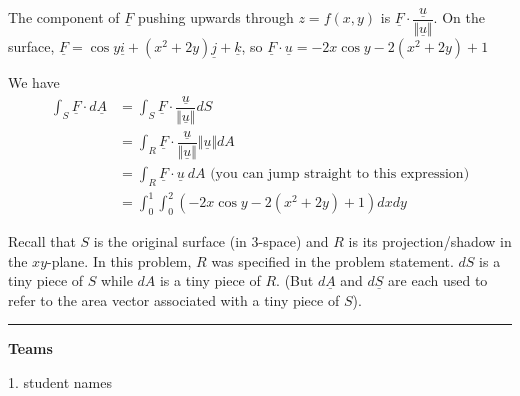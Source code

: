 \documentclass[12pt,letterpaper,noanswers]{exam}
\newcommand{\mb}[1]{\underline{#1}}
\begin{document}
The component of $\mb F$ pushing upwards through $z = f(x,y)$ is $\mb F \cdot \dfrac{\mb u}{\Vert \mb u \Vert}$.  On the surface, $\mb F = \cos y\mb i + (x^2+2y)\mb j + \mb k$, so $\mb F\cdot \mb u = -2x\cos y -2(x^2+2y) + 1$



We have 
\begin{align*}
\int_S \mb F\cdot d\mb A &= \int_S \mb F \cdot \dfrac{\mb u}{\Vert \mb u\Vert}dS \\
&= \int_R \mb F \cdot \dfrac{\mb u}{\Vert \mb u\Vert} \Vert\mb u\Vert dA \\
&= \int_R \mb F \cdot \mb u\ dA \text{ (you can jump straight to this expression)}\\
&= \int_0^1 \int_0^2 (-2x\cos y -2(x^2+2y) + 1) dx dy
\end{align*}

Recall that $S$ is the original surface (in $3$-space) and $R$ is its projection/shadow in the $xy$-plane.  In this problem, $R$ was specified in the problem statement. $dS$ is a tiny piece of $S$ while $dA$ is a tiny piece of $R$.  (But $d\mb A$ and $d\mb S$ are each used to refer to the area vector associated with a tiny piece of $S$).

\vspace{0.2cm}
\hrule
\vspace{0.2cm}

\noindent\textbf{Teams}
\begin{multicols}{2}

1.  student names
\end{multicols}
\end{document}
